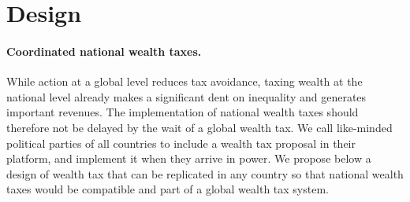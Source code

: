 \documentclass[12pt,english]{article}
\begin{document}
\section{Design}\label{sec:design}

\paragraph{Coordinated national wealth taxes.} While action at a global level reduces tax avoidance, taxing wealth at the national level already makes a significant dent on inequality and generates important revenues. 
The implementation of national wealth taxes should therefore not be delayed by the wait of a global wealth tax. 
We call like-minded political parties of all countries to include a wealth tax proposal in their platform, and implement it when they arrive in power. We propose below a design of wealth tax that can be replicated in any country so that national wealth taxes would be compatible and part of a global wealth tax system. 
\end{document}
